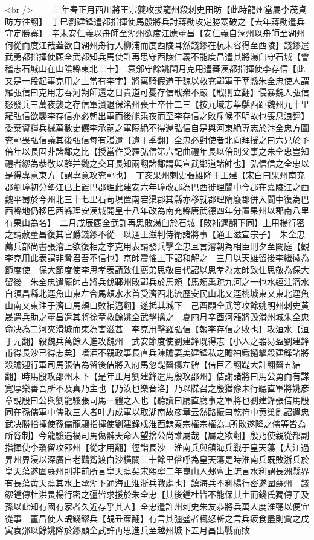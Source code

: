 <br />
　　三年春正月西川將王宗夔攻拔龍州殺刺史田昉【此時龍州當屬李茂貞眆方往翻】　丁巳劉建鋒遣都指揮使馬殷將兵討蔣勛攻定勝寨破之【去年蔣勛遣兵守定勝寨】　辛未安仁義以舟師至湖州欲度江應董昌【安仁義自潤州以舟師至湖州何從而度江哉蓋欲自湖州舟行入柳浦而度西陵耳然錢鏐在杭未容得至西陵】錢鏐遣武勇都指揮使顧全武都知兵馬使許再思守西陵仁義不能度昌遣其將湯臼守石城【會稽志石城山在山隂縣東北三十】　袁邠守餘姚閏月克用遣蕃漢都指揮使李存信【此又是一段起事克用之上當有李字】將萬騎假道于魏以救兖鄆軍于莘縣朱全忠使人謂羅弘信曰克用志吞河朔師還之日貴道可憂存信戢衆不嚴【戢則立翻】侵暴魏人弘信怒發兵三萬夜襲之存信軍潰退保洺州喪士卒什二三【按九域志莘縣西距魏州九十里羅弘信欲襲李存信亦必朝出軍而後能乘夜而至李存信之敗斥候不明故也喪息浪翻】委棄資糧兵械萬數史儼李承嗣之軍隔絶不得還弘信自是與河東絶專志於汴全忠方圖兖鄆畏弘信議其後弘信每有贈遺【遺于季翻】全忠必對使者北向拜授之曰六兄於予倍年以長固非諸鄰之比【授當作受羅弘信第六記曲禮年長以倍則父事之朱全忠豈知禮者繆為恭敬以離并魏之交耳長知兩翻諸鄰謂與宣武鄰道諸帥也】弘信信之全忠以是得專意東方【謂專意攻兖鄆也】　丁亥果州刺史張雄降于王建【宋白曰果州南充郡劉璋初分墊江已上置巴郡理此建安六年璋改郡為巴西徙理閬中今郡在嘉陵江之西魏平蜀於今州北三十七里石苟埧置南宕渠郡其縣亦移就郡理隋廢郡併入閬中復為巴西縣地仍移巴西縣理安漢城開皇十八年改為南充縣唐武德四年分置果州以郡南八里有果山為名】　二月戊辰顧全武許再思敗湯臼於石城【敗補邁翻下同】上用楊行密之請赦董昌復其官爵錢鏐不從　以通王滋判侍衛諸將事【通王滋宣宗子】　朱全忠薦兵部尚書張濬上欲復相之李克用表請發兵擊全忠且言濬朝為相臣則夕至闕庭【觀李克用此表謂非脅君吾不信也】京師震懼上下詔和解之　三月以天雄留後李繼徽為節度使　保大節度使李思孝表請致仕薦弟思敬自代詔以思孝為太師致仕思敬為保大留後　朱全忠遣龎師古將兵伐鄆州敗鄆兵於馬頰【馬頰禹疏九河之一也水經注濟水自須昌縣北逕魚山東左合馬頰水水首受濟西北流歷安民山北又逕桃城東又東北逕魚山南又東注于濟曰馬頰口敗補邁翻】遂抵其城下　己酉顧全武等攻餘姚明州刺史黄晟遣兵助之董昌遣其將徐章救餘姚全武擊擒之　夏四月辛酉河漲將毁滑州城朱全忠命决為二河夾滑城而東為害滋甚　李克用擊羅弘信【報李存信之敗也】攻洹水【洹于元翻】殺魏兵萬餘人進攻魏州　武安節度使劉建鋒既得志【小人之器易盈劉建鋒甫得長沙已得志矣】嗜酒不親政事長直兵陳贍妻美建鋒私之贍袖鐵撾擊殺建鋒諸將殺贍迎行軍司馬張佶為留後佶將入府馬忽踶齧傷左髀【佶巨乙翻踶大計翻齧五結翻】時馬殷攻邵州未下【是年正月劉建鋒遣馬殷攻邵州】佶謝諸將曰馬公勇而有謀寛厚樂善吾所不及真乃主也【乃汝也樂音洛】乃以牒召之殷猶豫未行聽直軍將姚彦章說殷曰公與劉龍驤張司馬一體之人也【聽讀曰廳直廳事之軍將也劉建鋒張佶馬殷同在孫儒軍中儒敗三人者叶力成軍以取湖南故彦章云然路振曰乾符中黄巢亂詔遣忠武决勝指揮使孫儒龍驤指揮使劉建鋒戍淮西隷秦宗權宗權為□所敗遂降之儒等皆為所脅制】今龍驤遇禍司馬傷髀天命人望捨公尚誰屬哉【屬之欲翻】殷乃使親從都副指揮使李瓊留攻邵州【從才用翻】徑詣長沙　淮南兵與鎮海兵戰于皇天蕩【大江過昇州界浸以深廣自老鸛觜渡白沙横關三十餘里俗呼為皇天蕩是時淮南兵既敗浙兵於皇天蕩遂圍蘇州則非前所言皇天蕩矣宋熙寧二年崑山人郟亶上疏言水利謂長洲縣界有長蕩黄天蕩其水上承湖下通海正淮浙兵戰處也】鎮海兵不利楊行密遂圍蘇州　錢鏐鍾傳杜洪畏楊行密之彊皆求援於朱全忠【其後鍾杜皆不能保其土而錢氏獨傳子及孫以此知有國有家者久近存乎其人】全忠遣許州刺史朱友恭將兵萬人度淮聽以便宜從事　董昌使人覘錢鏐兵【覘丑亷翻】有言其彊盛者輒怒斬之言兵疲食盡則賞之戊寅袁邠以餘姚降於鏐顧全武許再思進兵至越州城下五月昌出戰而敗